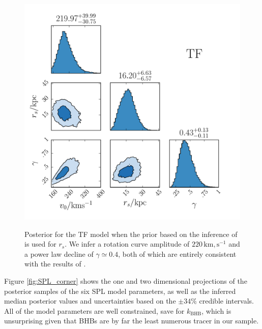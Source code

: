 \documentclass[useAMS,twocolumn,usenatbib]{mn2e}
\def\km,s{{\,\mathrm{km,s^{-1}}}}
\begin{document}
\begin{figure}
\includegraphics[width=\columnwidth]{plots/corner_TF}\\
\caption{Posterior for the TF model when the prior based on the inference of \citet{Gi14} is used for $r_s$. 
We infer a rotation curve amplitude of $220\km,s$ and a power law decline of $\gamma \simeq 0.4$, both of which are entirely consistent with the results of \citet{Gi14}.}
\label{fig:TF_posterior}
\end{figure}



Figure \ref{fig:SPL_corner} shows the one and two dimensional projections of the posterior samples of the six SPL model parameters, as well as the inferred median posterior values and uncertainties based on the $\pm 34\%$ credible intervals. 
All of the model parameters are well constrained, save for $k_\mathrm{BHB}$, which is unsurprising given that BHBs are by far the least numerous tracer in our sample.
\end{document}
